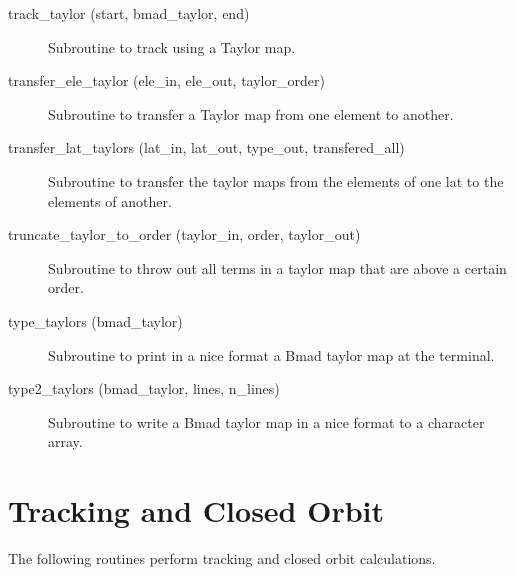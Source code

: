 \begin{description}
\label{r:track.taylor}
\item[track_taylor (start, bmad_taylor, end)] \Newline
Subroutine to track using a Taylor map. 

\label{r:transfer.ele.taylor}
\item[transfer_ele_taylor (ele_in, ele_out, taylor_order)] \Newline 
Subroutine to transfer a Taylor map from one element to another.

\label{r:transfer.lat.taylors}
\item[transfer_lat_taylors (lat_in, lat_out, 
                                             type_out, transfered_all)] \Newline 
Subroutine to transfer the taylor maps from the elements of one lat to
the elements of another. 

\label{r:truncate.taylor.to.order}
\item[truncate_taylor_to_order (taylor_in, order, taylor_out)] \Newline 
Subroutine to throw out all terms in a taylor map that are above a certain order.

\label{r:type.taylors}
\item[type_taylors (bmad_taylor)] \Newline
Subroutine to print in a nice format a Bmad taylor map at the terminal. 

\label{r:type2.taylors}
\item[type2_taylors (bmad_taylor, lines, n_lines)] \Newline
Subroutine to write a Bmad taylor map in a nice format to a character array. 

\end{description}

\section{Tracking and Closed Orbit}
\label{r:track}    

The following routines perform tracking and closed orbit calculations.

